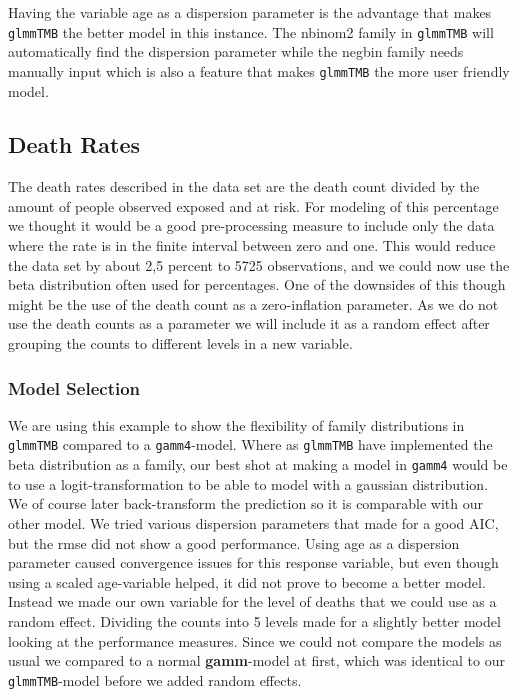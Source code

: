 \documentclass[12pt, twoside,hidelinks]{article}
\theoremstyle{definition}
\numberwithin{equation}{section}
\begin{document}
Having the variable age as a dispersion parameter is the advantage that makes \texttt{glmmTMB} the better model in this instance. The nbinom2 family in \texttt{glmmTMB} will automatically find the dispersion parameter while the negbin family needs manually input which is also a feature that makes \texttt{glmmTMB} the more user friendly model.


\subsection{Death Rates}\label{sec:analysis:death_rate}

The death rates described in the data set are the death count divided by the amount of people observed exposed and at risk. For modeling of this percentage we thought it would be a good pre-processing measure to include only the data where the rate is in the finite interval between zero and one. This would reduce the data set by about 2,5 percent to 5725 observations, and we could now use the beta distribution often used for percentages. One of the downsides of this though might be the use of the death count as a zero-inflation parameter. As we do not use the death counts as a parameter we will include it as a random effect after grouping the counts to different levels in a new variable.

\subsubsection{Model Selection}
We are using this example to show the flexibility of family distributions in \texttt{glmmTMB} compared to a \texttt{gamm4}-model. Where as \texttt{glmmTMB} have implemented the beta distribution as a family, our best shot at making a model in \texttt{gamm4} would be to use a logit-transformation to be able to model with a gaussian distribution. We of course later back-transform the prediction so it is comparable with our other model. We tried various dispersion parameters that made for a good AIC, but the rmse did not show a good performance. Using age as a dispersion parameter caused convergence issues for this response variable, but even though using a scaled age-variable helped, it did not prove to become a better model.
\newline
Instead we made our own variable for the level of deaths that we could use as a random effect. Dividing the counts into 5 levels made for a slightly better model looking at the performance measures. Since we could not compare the models as usual we compared to a normal \textbf{gamm}-model at first, which was identical to our \texttt{glmmTMB}-model before we added random effects.
\end{document}
